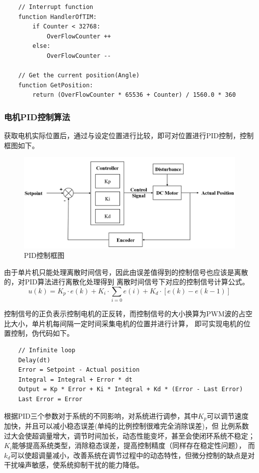 \documentclass[11pt, a4paper, oneside]{ctexart}
\begin{document}
\begin{verbatim}
    // Interrupt function
    function HandlerOfTIM:
        if Counter < 32768:
            OverFlowCounter ++
        else:
            OverFlowCounter --
    
    // Get the current position(Angle)
    function GetPosition:
        return (OverFlowCounter * 65536 + Counter) / 1560.0 * 360
\end{verbatim}

\subsubsection{电机PID控制算法}
获取电机实际位置后，通过与设定位置进行比较，即可对位置进行PID控制，控制框图如下。
\begin{figure}[H]
    \centering
    \includegraphics[scale=0.32]{PID}
    \caption{PID控制框图}
    \label{PID}
\end{figure}
由于单片机只能处理离散时间信号，因此由误差值得到的控制信号也应该是离散的，对PID算法进行离散化处理得到
离散时间信号下对应的控制信号计算公式。
$$
u(k)=K_{p}\cdot e(k)+K_i\cdot\sum_{i=0}e(i)+K_{d}\cdot[e(k)-e(k-1)]
$$

控制信号的正负表示控制电机的正反转，而控制信号的大小换算为PWM波的占空比大小，单片机每间隔一定时间采集电机的位置并进行计算，
即可实现电机的位置控制，伪代码如下。
\begin{verbatim}
    // Infinite loop
    Delay(dt)
    Error = Setpoint - Actual position
    Integral = Integral + Error * dt
    Output = Kp * Error + Ki * Integral + Kd * (Error - Last Error)
    Last Error = Error
\end{verbatim}

根据PID三个参数对于系统的不同影响，对系统进行调参，其中$K_p$可以调节速度加快，并且可以减小稳态误差(单纯的比例控制很难完全消除误差)，但
比例系数过大会使超调量增大，调节时间加长，动态性能变坏，甚至会使闭环系统不稳定；$K_i$能够提高系统类型，消除稳态误差，提高控制精度（同样存在稳定性问题），
而$k_d$可以使超调量减小，改善系统在调节过程中的动态特性，但微分控制的缺点是对干扰噪声敏感，使系统抑制干扰的能力降低。
\end{document}
